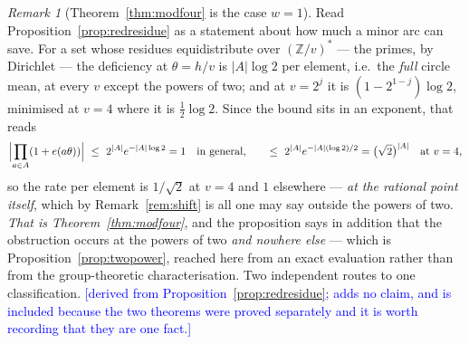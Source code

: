 \documentclass[11pt,a4paper]{article}
\theoremstyle{plain}
\theoremstyle{definition}
\theoremstyle{remark}
\newtheorem{remark}[theorem]{Remark}
\newcommand{\STATUS}[1]{\textcolor{blue}{\textsf{[#1]}}}
\begin{document}
\begin{remark}[Theorem~\ref{thm:modfour} is the case $w=1$]\label{rem:modfourcorollary}
Read Proposition~\ref{prop:redresidue} as a statement about how much a minor arc can save. For a
set whose residues equidistribute over $(\mathbb{Z}/v)^{*}$ --- the primes, by Dirichlet --- the
deficiency at $\theta=h/v$ is $|A|\log2$ per element, i.e.\ the \emph{full} circle mean, at every
$v$ except the powers of two; and at $v=2^{j}$ it is $(1-2^{1-j})\log2$, minimised at $v=4$ where
it is $\tfrac12\log2$. Since the bound sits in an exponent, that reads
\[
  \Bigl|\prod_{a\in A}(1+e(a\theta))\Bigr|\ \le\ 2^{|A|}e^{-|A|\log2}=1
  \quad\text{in general},\qquad
  \le\ 2^{|A|}e^{-|A|(\log2)/2}=\bigl(\sqrt2\bigr)^{|A|}
  \quad\text{at }v=4,
\]
so the rate per element is $1/\sqrt2$ at $v=4$ and $1$ elsewhere --- \emph{at the rational
point itself}, which by Remark~\ref{rem:shift} is all one may say outside the powers of two.
\emph{That is Theorem~\ref{thm:modfour}}, and the proposition says in addition that the obstruction occurs at
the powers of two \emph{and nowhere else} --- which is Proposition~\ref{prop:twopower}, reached
here from an exact evaluation rather than from the group-theoretic characterisation. Two
independent routes to one classification.
\STATUS{derived from Proposition~\ref{prop:redresidue}; adds no claim, and is included because
the two theorems were proved separately and it is worth recording that they are one fact.}
\end{remark}
\end{document}
